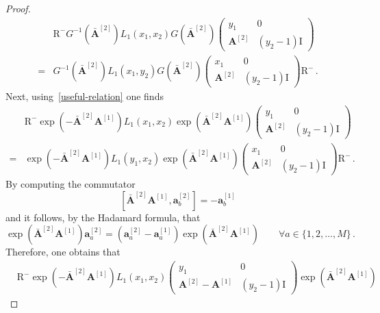 \documentclass[11pt]{article}
\numberwithin{equation}{section}
\newcommand{\OA}{\mathbf{A}}
\newcommand{\OAD}{\mathbf{\bar{A}}}
\newcommand{\M}{M}
\newcommand{\ID}{\mathrm{I}}
\newcommand{\abrOSCR}{\mathrm{R}}
\begin{document}
\begin{proof}
\begin{equation}
\begin{split}
		&\abrOSCR^{-}G^{-1}(\OAD^{[2]})L_{1}(x_{1},x_{2})G(\OAD^{[2]})\left(\begin{array}{cc}
			y_{1}&0\\
			\OA^{[2]}&(y_{2}-1)\ID
		\end{array}\right)
		\\=&
		G^{-1}(\OAD^{[2]})L_{1}(x_{1},y_{2})G(\OAD^{[2]})\left(\begin{array}{cc}
			x_1&0\\
			\OA^{[2]}&(y_{2}-1)\ID
		\end{array}\right)\abrOSCR^{-}\,.
	\end{split}
\end{equation}
Next, using~\eqref{useful-relation} one finds
\begin{equation}
	\begin{split}
		&\abrOSCR^{-}\exp{\left(-\OAD^{[2]}\OA^{[1]}\right)}L_{1}(x_{1},x_{2})\exp{\left(\OAD^{[2]}\OA^{[1]}\right)}\left(\begin{array}{cc}
			y_{1}&0\\
			\OA^{[2]}&(y_{2}-1)\ID
		\end{array}\right)
		\\=&
		\exp{\left(-\OAD^{[2]} \OA^{[1]}\right)}L_{1}(y_{1},x_{2})\exp{\left(\OAD^{[2]}\OA^{[1]}\right)}\left(\begin{array}{cc}
			x_1&0\\
			\OA^{[2]}&(y_{2}-1)\ID
		\end{array}\right)\abrOSCR^{-}\,.
	\end{split}
\end{equation}
By computing the commutator
\begin{equation}
	\left[\OAD^{[2]}\OA^{[1]},\mathbf{a}_{b}^{[2]}\right]=-\mathbf{a}_{b}^{[1]}
\end{equation}
 and it follows, by the Hadamard formula,
 that
\begin{equation}
	\exp{\left(\OAD^{[2]}\OA^{[1]}\right)}\mathbf{a}_{a}^{[2]}=\left(\mathbf{a}_{a}^{[2]}-\mathbf{a}_{a}^{[1]}\right)	\exp{\left(\OAD^{[2]}\OA^{[1]}\right)} \qquad \forall a\in \{1,2,\ldots,\M\}\,.
\end{equation}
Therefore, one obtains that
\begin{equation}
	\begin{split}
		&\abrOSCR^{-}\exp{\left(-\OAD^{[2]}\OA^{[1]}\right)}L_{1}(x_{1},x_{2})\left(\begin{array}{cc}
			y_1&0\\
			\OA^{[2]}-\OA^{[1]}&(y_{2}-1)\ID
		\end{array}\right)\exp{\left(\OAD^{[2]}\OA^{[1]}\right)}

\end{split}
\end{equation}
\end{proof}
\end{document}
